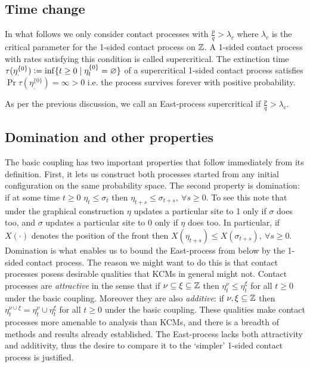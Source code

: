 \subsection{Time change}\label{ssec:time_change}

In what follows we only consider contact processes with $\frac{p}{q} > \lambda_c$ where $\lambda_c$ is the critical parameter for the 1-sided contact process on $\mathbb{Z}$. A 1-sided contact process with rates satisfying this condition is called supercritical. The extinction time $\tau(\eta^{\{0\}}_.) \vcentcolon= \inf\{t \geq 0 \mid \eta^{\{0\}}_t = \varnothing \}$ of a supercritical 1-sided contact process satisfies $\Pr{\tau(\eta^{\{0\}}_.) = \infty} > 0$ i.e. the process survives forever with positive probability. 

\begin{notation}
As per the previous discussion, we call an East-process supercritical if $\frac{p}{q} > \lambda_c$. 
\end{notation}

\subsection{Domination and other properties}
The basic coupling has two important properties that follow immediately from its definition. First, it lets us construct both processes started from any initial configuration on the same probability space. The second property is domination: if at some time $t \geq 0$ $\eta_t \leq \sigma_t$ then $\eta_{t+s} \leq \sigma_{t+s},\ \forall s \geq 0$. To see this note that under the graphical construction $\eta$ updates a particular site to 1 only if $\sigma$ does too, and $\sigma$ updates a particular site to 0 only if $\eta$ does too. In particular, if $X(\cdot)$ denotes the position of the front then $X(\eta_{t+s}) \leq X(\sigma_{t+s}),\ \forall s \geq 0$. \\

Domination is what enables us to bound the East-process from below by the 1-sided contact process. The reason we might want to do this is that contact processes posess desirable qualities that KCMs in general might not. Contact processes are \textit{attractive} in the sense that if $\nu \subseteq \xi \subseteq \mathbb{Z}$ then $\eta^\nu_t \leq \eta^\xi_t$ for all $t \geq 0$ under the basic coupling. Moreover they are also \textit{additive}: if $\nu, \xi \subseteq \mathbb{Z}$ then $\eta^{\nu \cup \xi}_t = \eta^\nu_t \cup \eta^\xi_t$ for all $t \geq 0$ under the basic coupling. These qualities make contact processes more amenable to analysis than KCMs, and there is a breadth of methods and results already established. The East-process lacks both attractivity and additivity, thus the desire to compare it to the `simpler' 1-sided contact process is justified. 
